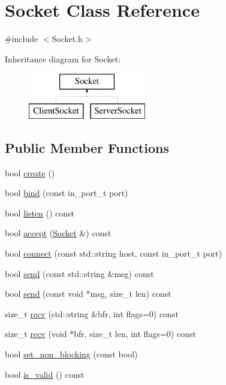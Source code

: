 \hypertarget{class_socket}{}\section{Socket Class Reference}
\label{class_socket}


{\ttfamily \#include $<$Socket.\+h$>$}

Inheritance diagram for Socket\+:\begin{figure}[H]
\begin{center}
\leavevmode
\includegraphics[height=2.000000cm]{class_socket}
\end{center}
\end{figure}
\subsection*{Public Member Functions}
\begin{DoxyCompactItemize}
\item 
bool \hyperlink{class_socket_a6afde2dca985dacdfa770141192e2daf}{create} ()
\item 
bool \hyperlink{class_socket_ae5b928832ae34a66d3abf778c59ef09a}{bind} (const in\+\_\+port\+\_\+t port)
\item 
bool \hyperlink{class_socket_a0988791cca0cc0eeee0c854500d7f527}{listen} () const 
\item 
bool \hyperlink{class_socket_a068f789510d289f59a1fc1f51fbb9ed3}{accept} (\hyperlink{class_socket}{Socket} \&) const 
\item 
bool \hyperlink{class_socket_a4236aa7f4def254e1fb4d062eb0bd060}{connect} (const std\+::string host, const in\+\_\+port\+\_\+t port)
\item 
bool \hyperlink{class_socket_a3565cd4d62dc287135559e0e5f564d31}{send} (const std\+::string \&msg) const 
\item 
bool \hyperlink{class_socket_a645d148645e5985891bc299514f585a1}{send} (const void $\ast$msg, size\+\_\+t len) const 
\item 
size\+\_\+t \hyperlink{class_socket_ab220e684100ebb15da125890f7d69d5d}{recv} (std\+::string \&bfr, int flags=0) const 
\item 
size\+\_\+t \hyperlink{class_socket_a1a5cc5813b16a3235e177030ce2e09d2}{recv} (void $\ast$bfr, size\+\_\+t len, int flags=0) const 
\item 
bool \hyperlink{class_socket_a89233baf04fd377294b3b7993d04dfcc}{set\+\_\+non\+\_\+blocking} (const bool)
\item 
bool \hyperlink{class_socket_a157f83a7404aec259c58783cd9af6ea6}{is\+\_\+valid} () const 
\end{DoxyCompactItemize}


